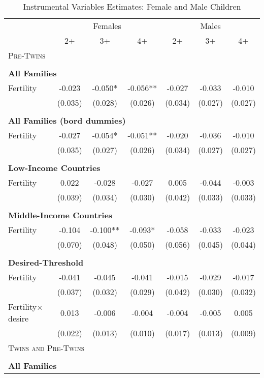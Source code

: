 \begin{table}[!htbp] \centering 
\caption{Instrumental Variables Estimates: Female and Male Children} 
\label{TWINtab:IVgend} 
\begin{tabular}{lcccccc} \toprule \toprule 
&\multicolumn{3}{c}{Females}&\multicolumn{3}{c}{Males}\\ 
\cmidrule(r){2-4} \cmidrule(r){5-7} 
&2+&3+&4+&2+&3+&4+ \\ \midrule 
\multicolumn{7}{l}{\textsc{Pre-Twins}}\\ 
&&&&\\
\multicolumn{7}{l}{\textbf{All Families}}\\ 
Fertility&-0.023&-0.050*&-0.056**&-0.027&-0.033&-0.010\\
&(0.035)&(0.028)&(0.026)&(0.034)&(0.027)&(0.027)\\
&&&&\\
\multicolumn{7}{l}{\textbf{All Families (bord dummies)}}\\ 
Fertility&-0.027&-0.054*&-0.051**&-0.020&-0.036&-0.010\\
&(0.035)&(0.027)&(0.026)&(0.034)&(0.027)&(0.027)\\
&&&&\\
\multicolumn{7}{l}{\textbf{Low-Income Countries}}\\ 
Fertility&0.022&-0.028&-0.027&0.005&-0.044&-0.003\\
&(0.039)&(0.034)&(0.030)&(0.042)&(0.033)&(0.033)\\
&&&&\\
\multicolumn{7}{l}{\textbf{Middle-Income Countries}}\\ 
Fertility&-0.104&-0.100**&-0.093*&-0.058&-0.033&-0.023\\
&(0.070)&(0.048)&(0.050)&(0.056)&(0.045)&(0.044)\\
&&&&\\
\multicolumn{7}{l}{\textbf{Desired-Threshold}}\\ 
Fertility&-0.041&-0.045&-0.041&-0.015&-0.029&-0.017\\
&(0.037)&(0.032)&(0.029)&(0.042)&(0.030)&(0.032)\\
Fertility$\times$desire&0.013&-0.006&-0.004&-0.004&-0.005&0.005\\
&(0.022)&(0.013)&(0.010)&(0.017)&(0.013)&(0.009)\\
\midrule\multicolumn{5}{l}{\textsc{Twins and Pre-Twins}}\\ 
&&&&\\
\multicolumn{7}{l}{\textbf{All Families}}\\ 

\end{tabular}
\end{table}

